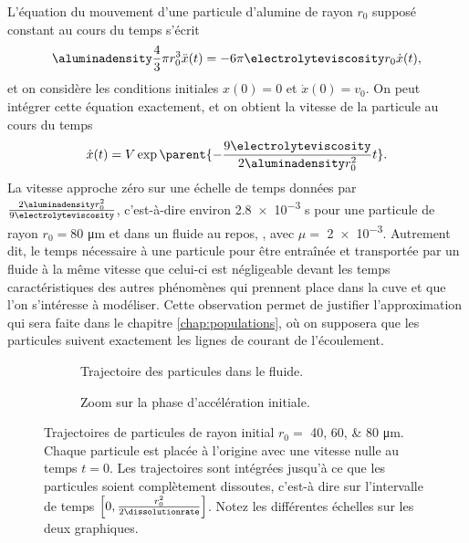 \begin{remarque}
  L'équation du mouvement d'une particule d'alumine de rayon $r_0$
  supposé constant au cours du temps s'écrit
  \begin{equation*}
    \aluminadensity \frac{4}{3}\pi r_0^3 \ddot x(t) = -
    6\pi\electrolyteviscosity r_0 \dot x(t),
  \end{equation*}
  et on considère les conditions initiales $x(0) = 0$ et $\dot x(0) =
  v_0$. On peut intégrer cette équation exactement, et on obtient la
  vitesse de la particule au cours du temps
  \begin{equation*}
    \dot x(t) = V\exp\parent{-\frac{9\electrolyteviscosity}{2\aluminadensity r_0^2}t}.
  \end{equation*}
  La vitesse approche zéro sur une échelle de temps données par
  $\frac{2\aluminadensity r_0^2}{9\electrolyteviscosity}$,
  c'est-à-dire environ \num{2.8e-3} \si{\second} pour une particule de rayon $r_0 =
  \num{80}$ \si{\micro\meter} et dans un fluide au repos, \ie, avec $\mu
  = $ \num{2e-3}. Autrement dit, le temps nécessaire à une particule
  pour être entraînée et transportée par un fluide à la même vitesse
  que celui-ci est négligeable devant les temps caractéristiques des
  autres phénomènes qui prennent place dans la cuve et que l'on
  s'intéresse à modéliser. Cette observation permet de justifier
  l'approximation qui sera faite dans le chapitre
  \ref{chap:populations}, où on supposera que les particules suivent
  exactement les lignes de courant de l'écoulement.
\end{remarque}

\begin{figure}
 \begin{center}
    \begin{subfigure}[b]{0.49\textwidth}
      
      \caption{Trajectoire des particules dans le fluide.}
      \label{fig:particle-trajectories-a}
    \end{subfigure}
    \begin{subfigure}[b]{0.49\textwidth}
      
      \caption{Zoom sur la phase d'accélération initiale.}
      \label{fig:particle-trajectories-b}
    \end{subfigure}

    \caption{Trajectoires de particules de rayon initial
      $r_0 = $ \numlist{40;60;80} \si{\micro\meter}. Chaque
    particule est placée à l'origine avec une vitesse nulle
    au temps $t = 0$. Les trajectoires sont intégrées jusqu'à ce que
    les particules soient complètement dissoutes, c'est-à dire sur l'intervalle
    de temps $\left[0, \frac{r_0^2}{2\dissolutionrate}\right]$. Notez
    les différentes échelles sur les deux graphiques.}
    \label{fig:particle-trajectories}
 \end{center}
\end{figure}
